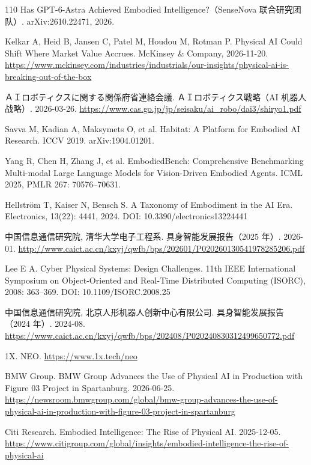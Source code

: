 \documentclass[10pt,fontset=fandol]{ctexart}
\begin{document}
\begin{thebibliography}{110}
Has GPT-6-Astra Achieved Embodied Intelligence?（SenseNova 联合研究团队）. arXiv:2610.22471, 2026.

Kelkar A, Heid B, Jansen C, Patel M, Houdou M, Rotman P. Physical AI Could Shift Where Market Value Accrues. McKinsey \& Company, 2026-11-20. \url{https://www.mckinsey.com/industries/industrials/our-insights/physical-ai-is-breaking-out-of-the-box}

{\jafont ＡＩロボティクスに関する関係府省連絡会議}. {\jafont ＡＩロボティクス戦略}（AI 机器人战略）. 2026-03-26. \url{https://www.cas.go.jp/jp/seisaku/ai\_robo/dai3/shiryo1.pdf}

Savva M, Kadian A, Maksymets O, et al. Habitat: A Platform for Embodied AI Research. ICCV 2019. arXiv:1904.01201.

Yang R, Chen H, Zhang J, et al. EmbodiedBench: Comprehensive Benchmarking Multi-modal Large Language Models for Vision-Driven Embodied Agents. ICML 2025, PMLR 267: 70576–70631.

Hellström T, Kaiser N, Bensch S. A Taxonomy of Embodiment in the AI Era. Electronics, 13(22): 4441, 2024. DOI: 10.3390/electronics13224441

中国信息通信研究院, 清华大学电子工程系. 具身智能发展报告（2025 年）. 2026-01. \url{http://www.caict.ac.cn/kxyj/qwfb/bps/202601/P020260130541978285206.pdf}

Lee E A. Cyber Physical Systems: Design Challenges. 11th IEEE International Symposium on Object-Oriented and Real-Time Distributed Computing (ISORC), 2008: 363–369. DOI: 10.1109/ISORC.2008.25

中国信息通信研究院, 北京人形机器人创新中心有限公司. 具身智能发展报告（2024 年）. 2024-08. \url{https://www.caict.ac.cn/kxyj/qwfb/bps/202408/P020240830312499650772.pdf}

1X. NEO. \url{https://www.1x.tech/neo}

BMW Group. BMW Group Advances the Use of Physical AI in Production with Figure 03 Project in Spartanburg. 2026-06-25. \url{https://newsroom.bmwgroup.com/global/bmw-group-advances-the-use-of-physical-ai-in-production-with-figure-03-project-in-spartanburg}

Citi Research. Embodied Intelligence: The Rise of Physical AI. 2025-12-05. \url{https://www.citigroup.com/global/insights/embodied-intelligence-the-rise-of-physical-ai}


\end{thebibliography}
\end{document}
